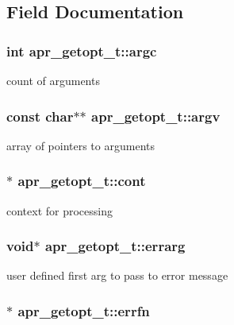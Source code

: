 \subsection{Field Documentation}
\hypertarget{structapr__getopt__t_a58aeb33137aabdd5a00efbde05652094}{
\subsubsection[{argc}]{\setlength{\rightskip}{0pt plus 5cm}int apr\-\_\-getopt\-\_\-t\-::argc}}\label{structapr__getopt__t_a58aeb33137aabdd5a00efbde05652094}
count of arguments \hypertarget{structapr__getopt__t_a296c27d8db2fe6d4b88c5c7a85c40c02}{
\subsubsection[{argv}]{\setlength{\rightskip}{0pt plus 5cm}const char$\ast$$\ast$ apr\-\_\-getopt\-\_\-t\-::argv}}\label{structapr__getopt__t_a296c27d8db2fe6d4b88c5c7a85c40c02}
array of pointers to arguments \hypertarget{structapr__getopt__t_a63a073fb9c11bb2713b3d7f967e95a24}{
\subsubsection[{cont}]{$\ast$ apr\-\_\-getopt\-\_\-t\-::cont}}\label{structapr__getopt__t_a63a073fb9c11bb2713b3d7f967e95a24}
context for processing \hypertarget{structapr__getopt__t_a46db55c58789ab7fa99bb49544b0776e}{
\subsubsection[{errarg}]{\setlength{\rightskip}{0pt plus 5cm}void$\ast$ apr\-\_\-getopt\-\_\-t\-::errarg}}\label{structapr__getopt__t_a46db55c58789ab7fa99bb49544b0776e}
user defined first arg to pass to error message \hypertarget{structapr__getopt__t_a6bf3fd7ad92d1f0161cd895e1ad50d06}{
\subsubsection[{errfn}]{$\ast$ apr\-\_\-getopt\-\_\-t\-::errfn}}\label{structapr__getopt__t_a6bf3fd7ad92d1f0161cd895e1ad50d06}
